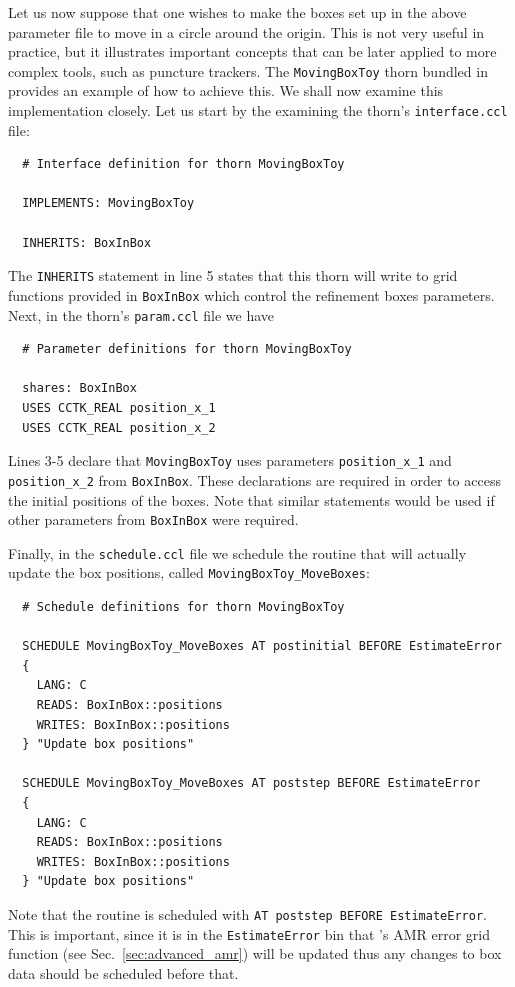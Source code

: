 Let us now suppose that one wishes to make the boxes set up in the above parameter file to move in a circle around the origin. This is not very useful in practice, but it illustrates important concepts that can be later applied to more complex tools, such as puncture trackers. The \texttt{MovingBoxToy} thorn bundled in \CarpetX\space provides an example of how to achieve this. We shall now examine this implementation closely. Let us start by the examining the thorn's \texttt{interface.ccl} file:
%
\begin{verbatim}
  # Interface definition for thorn MovingBoxToy

  IMPLEMENTS: MovingBoxToy

  INHERITS: BoxInBox
\end{verbatim}

The \texttt{INHERITS} statement in line 5 states that this thorn will write to grid functions provided in \texttt{BoxInBox} which control the refinement boxes parameters. Next, in the thorn's \texttt{param.ccl} file we have
%
\begin{verbatim}
  # Parameter definitions for thorn MovingBoxToy

  shares: BoxInBox
  USES CCTK_REAL position_x_1
  USES CCTK_REAL position_x_2
\end{verbatim}

Lines 3-5 declare that \texttt{MovingBoxToy} uses parameters \texttt{position\_x\_1} and \texttt{position\_x\_2} from \texttt{BoxInBox}. These declarations are required in order to access the initial positions of the boxes. Note that similar statements would be used if other parameters from \texttt{BoxInBox} were required.

Finally, in the \texttt{schedule.ccl} file we schedule the routine that will actually update the box positions, called \texttt{MovingBoxToy\_MoveBoxes}:
%
\begin{verbatim}
  # Schedule definitions for thorn MovingBoxToy

  SCHEDULE MovingBoxToy_MoveBoxes AT postinitial BEFORE EstimateError
  {
    LANG: C
    READS: BoxInBox::positions
    WRITES: BoxInBox::positions
  } "Update box positions"

  SCHEDULE MovingBoxToy_MoveBoxes AT poststep BEFORE EstimateError
  {
    LANG: C
    READS: BoxInBox::positions
    WRITES: BoxInBox::positions
  } "Update box positions"
\end{verbatim}

Note that the routine is scheduled with \texttt{AT poststep BEFORE EstimateError}. This is important, since it is in the \texttt{EstimateError} bin that \CarpetX's AMR error grid function (see Sec.~\ref{sec:advanced_amr}) will be updated thus any changes to box data should be scheduled before that.

